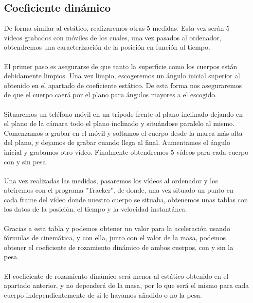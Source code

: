 \documentclass{article}
\begin{document}
\subsection{Coeficiente dinámico}
De forma similar al estático, realizaremos otras 5 medidas. Esta vez serán 5 vídeos grabados con móviles de los cuales, una vez pasados al ordenador, obtendremos una caracterización de la posición en función al tiempo.\\\\
El primer paso es asegurarse de que tanto la superficie como los cuerpos están debidamente limpios. Una vez limpio, escogeremos un ángulo inicial superior al obtenido en el apartado de coeficiente estático. De esta forma nos aseguraremos de que el cuerpo caerá por el plano para ángulos mayores a el escogido. \\\\ Situaremos un teléfono móvil en un trípode frente al plano inclinado dejando en el plano de la cámara todo el plano inclinado y situándose paralelo al mismo. \\ Comenzamos a grabar en el móvil y soltamos el cuerpo desde la marca más alta del plano, y dejamos de grabar cuando llega al final. Aumentamos el ángulo inicial y grabamos otro vídeo. Finalmente obtendremos 5 vídeos para cada cuerpo con y sin pesa. \\\\
Una vez realizadas las medidas, pasaremos los vídeos al ordenador y los abriremos con el programa "Tracker", de donde, una vez situado un punto en cada frame del vídeo donde nuestro cuerpo se situaba, obtenemos unas tablas con los datos de la posición, el tiempo y la velocidad instantánea. \\\\ Gracias a esta tabla y podemos obtener un valor para la aceleración usando fórmulas de cinemática, y con ella, junto con el valor de la masa, podemos obtener el coeficiente de rozamiento dinámico de ambos cuerpos, con y sin la pesa.\\\\ El coeficiente de rozamiento dinámico será menor al estático obtenido en el apartado anterior, y no dependerá de la masa, por lo que será el mismo para cada cuerpo independientemente de si le hayamos añadido o no la pesa. 

\clearpage
\end{document}

